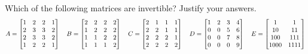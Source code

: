 \documentclass[a4paper]{amsart}
\begin{document}
\begin{exercise}\label{ex-invertible-i}
 Which of the following matrices are invertible?  Justify your
 answers. 
 \[ A = \left[\begin{matrix} 1&2&2&1 \\ 2&3&3&2 \\ 2&3&3&2 \\ 1&2&2&1 \end{matrix}\right]
    \quad
    B = \left[\begin{matrix} 2&2&2&2 \\ 1&2&2&2 \\ 1&1&2&2 \\ 1&1&1&2 \end{matrix}\right]
    \quad
    C = \left[\begin{matrix} 2&1&1&1 \\ 2&2&1&1 \\ 2&2&2&1 \\ 2&2&2&2 \end{matrix}\right]
    \quad
    D = \left[\begin{matrix} 1&2&3&4 \\ 0&0&5&6 \\ 0&0&7&8 \\ 0&0&0&9 \end{matrix}\right]
    \quad
    E = \left[\begin{matrix} 1 & 1 \\ 10 & 11 \\ 100 & 111 \\ 1000 & 1111 \end{matrix}\right]
 \]
\end{exercise}
\end{document}
